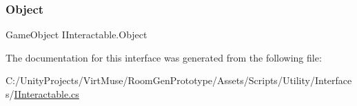 \subsubsection{\texorpdfstring{Object}{Object}}
{\footnotesize\ttfamily Game\+Object I\+Interactable.\+Object\hspace{0.3cm}{\ttfamily [get]}}



The documentation for this interface was generated from the following file\+:\begin{DoxyCompactItemize}
\item 
C\+:/\+Unity\+Projects/\+Virt\+Muse/\+Room\+Gen\+Prototype/\+Assets/\+Scripts/\+Utility/\+Interfaces/\mbox{\hyperlink{_i_interactable_8cs}{I\+Interactable.\+cs}}\end{DoxyCompactItemize}
